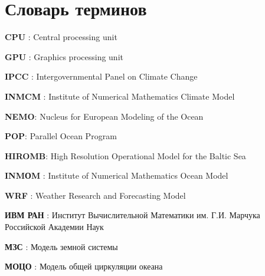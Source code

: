 \chapter*{Словарь терминов}             %

\textbf{CPU} : Central processing unit

\textbf{GPU} : Graphics processing unit

\textbf{IPCC} : Intergovernmental Panel on Climate Change

\textbf{INMCM} : Institute of Numerical Mathematics Climate Model

\textbf{NEMO}: Nucleus for European Modeling of the Ocean

\textbf{POP}: Parallel Ocean Program

\textbf{HIROMB}: High Resolution Operational Model for the Baltic Sea

\textbf{INMОM} : Institute of Numerical Mathematics Ocean Model

\textbf{WRF} : Weather Research and Forecasting Model

\textbf{ИВМ РАН} : Институт Вычислительной Математики им. Г.И. Марчука Российской Академии Наук

\textbf{МЗС} : Модель земной системы

\textbf{МОЦО} : Модель общей циркуляции океана
